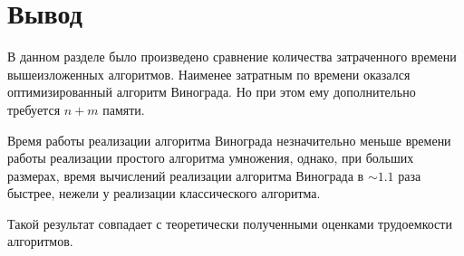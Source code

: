 \section*{Вывод}
В данном разделе было произведено сравнение количества затраченного вре­мени вышеизложенных алгоритмов.
Наименее затратным по времени оказался оптимизированный алгоритм Винограда.
Но при этом ему дополнительно требуется $n+m$ памяти.

Время работы реализации алгоритма Винограда незначительно меньше времени работы реализации простого алгоритма умножения, однако, при больших размерах, время вычислений реализации алгоритма Винограда в $\sim 1.1$ раза быстрее, нежели у реализации классического алгоритма.

Такой результат совпадает с теоретически полученными оценками трудоемкости алгоритмов.